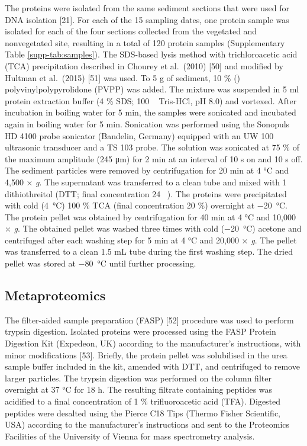 \documentclass[
  12 pt,
]{article}
\begin{document}
The proteins were isolated from the same sediment sections that were used for DNA isolation {[}21{]}. For each of the 15 sampling dates, one protein sample was isolated for each of the four sections collected from the vegetated and nonvegetated site, resulting in a total of 120 protein samples (Supplementary Table \ref{supp-tab:samples}). The SDS-based lysis method with trichloroacetic acid (TCA) precipitation described in Chourey et al.~(2010) {[}50{]} and modified by Hultman et al.~(2015) {[}51{]} was used. To 5 \si{\gram} of sediment, 10 \si{\percent} (\si{\wW}) polyvinylpolypyrolidone (PVPP) was added. The mixture was suspended in 5 \si{\ml} protein extraction buffer (4 \si{\percent} SDS; 100 \si{\milli\Molar} Tris-HCl, pH 8.0) and vortexed. After incubation in boiling water for 5 \si{\minute}, the samples were sonicated and incubated again in boiling water for 5 \si{\minute}. Sonication was performed using the Sonopuls HD 4100 probe sonicator (Bandelin, Germany) equipped with an UW 100 ultrasonic transducer and a TS 103 probe. The solution was sonicated at 75 \si{\percent} of the maximum amplitude (245 \si{\um}) for 2 \si{\minute} at an interval of 10 \si{\s} on and 10 \si{\s} off. The sediment particles were removed by centrifugation for 20 \si{\minute} at 4 \si{\degreeCelsius} and 4,500 × \emph{g}. The supernatant was transferred to a clean tube and mixed with 1 \si{\Molar} dithiothreitol (DTT; final concentration 24 \si{\milli\Molar}). The proteins were precipitated with cold (\SI{4}{\degreeCelsius}) 100 \si{\percent} TCA (final concentration 20 \si{\percent}) overnight at \SI{-20}{\degreeCelsius}. The protein pellet was obtained by centrifugation for 40 \si{\minute} at 4 \si{\degreeCelsius} and 10,000 × \emph{g}. The obtained pellet was washed three times with cold (\SI{-20}{\degreeCelsius}) acetone and centrifuged after each washing step for 5 \si{\minute} at 4 \si{\degreeCelsius} and 20,000 × \emph{g}. The pellet was transferred to a clean 1.5 \si{\milli\liter} tube during the first washing step. The dried pellet was stored at \SI{-80}{\degreeCelsius} until further processing.

\hypertarget{metaproteomics}{%
\subsection{Metaproteomics}\label{metaproteomics}}

The filter-aided sample preparation (FASP) {[}52{]} procedure was used to perform trypsin digestion. Isolated proteins were processed using the FASP Protein Digestion Kit (Expedeon, UK) according to the manufacturer's instructions, with minor modifications {[}53{]}. Briefly, the protein pellet was solubilised in the urea sample buffer included in the kit, amended with DTT, and centrifuged to remove larger particles. The trypsin digestion was performed on the column filter overnight at 37 \si{\degreeCelsius} for 18 \si{\hour}. The resulting filtrate containing peptides was acidified to a final concentration of 1 \si{\percent} trifluoroacetic acid (TFA). Digested peptides were desalted using the Pierce C18 Tips (Thermo Fisher Scientific, USA) according to the manufacturer's instructions and sent to the Proteomics Facilities of the University of Vienna for mass spectrometry analysis.
\end{document}
